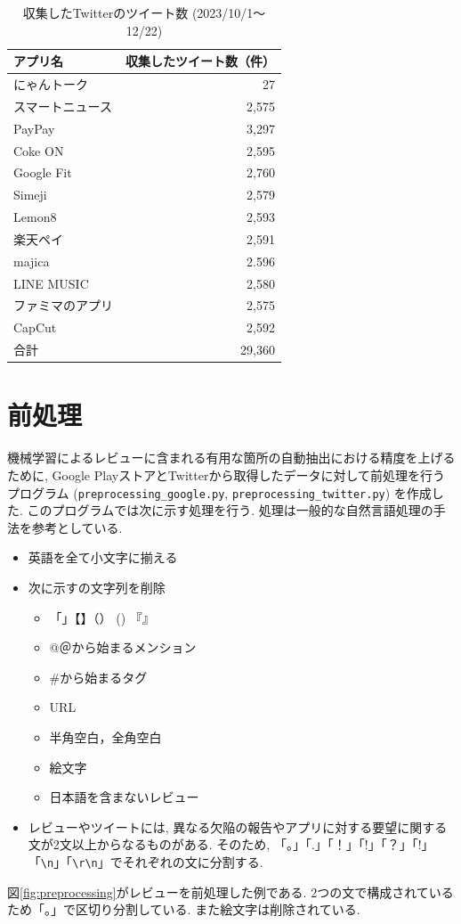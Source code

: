 \begin{table}[H]
  \caption{収集したTwitterのツイート数 (2023/10/1〜12/22) }
  \label{tb:rawtweetnum2023}
  \begin{center}
  \begin{tabular}{l|r}
    \hline
    アプリ名&収集したツイート数（件）\\\hline\hline
    にゃんトーク&27\\\hline
    スマートニュース&2,575\\\hline
    PayPay&3,297\\\hline
    Coke ON&2,595\\\hline
    Google Fit&2,760\\\hline
    Simeji&2,579\\\hline
    Lemon8&2,593\\\hline
    楽天ペイ&2,591\\\hline
    majica&2.596\\\hline
    LINE MUSIC&2,580\\\hline
    ファミマのアプリ&2,575\\\hline
    CapCut&2,592\\\hline\hline
    合計&29,360
  \end{tabular}\end{center}
\end{table}


\section{前処理}\label{preprocessing}
機械学習によるレビューに含まれる有用な箇所の自動抽出における精度を上げるために, Google PlayストアとTwitterから取得したデータに対して前処理を行うプログラム (\verb|preprocessing_google.py|, \verb|preprocessing_twitter.py|) を作成した. このプログラムでは次に示す処理を行う. 処理は一般的な自然言語処理の手法を参考としている. 
\begin{itemize}
  \item 英語を全て小文字に揃える
  \item 次に示すの文字列を削除
    \begin{itemize}
      \item 「」【】（） () 『』
      \item @＠から始まるメンション
      \item \#から始まるタグ
      \item URL
      \item 半角空白，全角空白
      \item 絵文字
      \item 日本語を含まないレビュー
    \end{itemize}
  \item レビューやツイートには, 異なる欠陥の報告やアプリに対する要望に関する文が2文以上からなるものがある. そのため, 「。」「.」「！」「!」「？」「!」「\verb|\n|」「\verb|\r\n|」でそれぞれの文に分割する. 
\end{itemize}
図\ref{fig:preprocessing}がレビューを前処理した例である. 2つの文で構成されているため「。」で区切り分割している. また絵文字は削除されている. 

